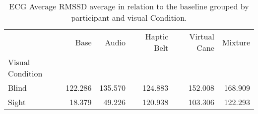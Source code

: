 
\begin{table}[!htb]
\centering
\caption{ECG Average RMSSD average in relation to the baseline grouped by participant and visual Condition.}
\label{tab:ecg_rmssd_average_group}
\begin{tabular}{lrrrrr}
\toprule
{} &    Base &   Audio &  Haptic Belt &  Virtual Cane &  Mixture \\
Visual Condition &         &         &              &               &          \\
\midrule
Blind            & 122.286 & 135.570 &      124.883 &       152.008 &  168.909 \\
Sight            &  18.379 &  49.226 &      120.938 &       103.306 &  122.293 \\
\bottomrule
\end{tabular}
\end{table}

